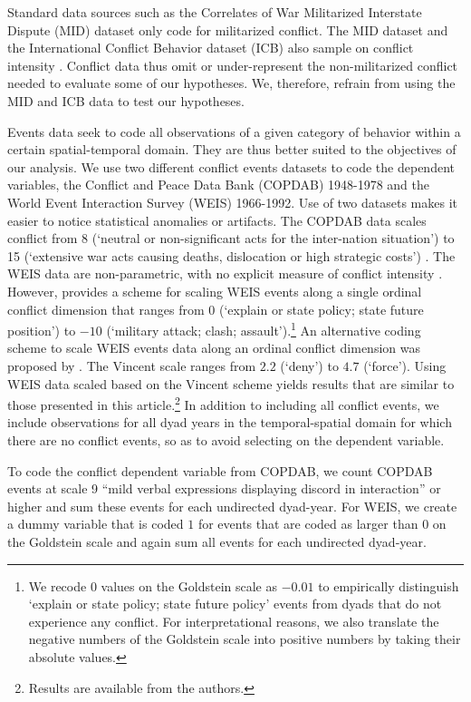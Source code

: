 \documentclass[12pt]{article}
\theoremstyle{hypothesis}
\begin{document}
Standard data sources such as the Correlates of War Militarized Interstate Dispute (MID) dataset only code for militarized conflict. The MID dataset and the International Conflict Behavior dataset (ICB) also sample on conflict intensity \citep{Smith:1998,Brecher:1997}. Conflict data thus omit or under-represent the non-militarized conflict needed to evaluate some of our hypotheses. We, therefore, refrain from using the MID and ICB data to test our hypotheses.

Events data seek to code all observations of a given category of behavior within a certain spatial-temporal domain.  They are thus better suited to the objectives of our analysis. We use two different conflict events datasets to code the dependent variables, the Conflict and Peace Data Bank (COPDAB) 1948-1978 and the World Event Interaction Survey (WEIS) 1966-1992. Use of two datasets makes it easier to notice statistical anomalies or artifacts. The COPDAB data scales conflict from 8 (`neutral or non-significant acts for the inter-nation situation') to 15 (`extensive war acts causing deaths, dislocation or high strategic costs') \citep{Azar:1993}. The WEIS data are non-parametric, with no explicit measure of conflict intensity \citep{McClelland:1983}. However, \citet{Goldstein:1992} provides a scheme for scaling WEIS events along a single ordinal conflict dimension that ranges from $0$ (`explain or state policy; state future position') to $-10$ (`military attack; clash; assault').\footnote{We recode $0$ values on the Goldstein scale as $-0.01$ to empirically distinguish `explain or state policy; state future policy' events from dyads that do not experience any conflict. For interpretational reasons, we also translate the negative numbers of the Goldstein scale into positive numbers by taking their absolute values.} An alternative coding scheme to scale WEIS events data along an ordinal conflict dimension was proposed by \citet{Vincent:1979}. The Vincent scale ranges from $2.2$ (`deny') to $4.7$ (`force'). Using WEIS data scaled based on the Vincent scheme yields results that are similar to those presented in this article.\footnote{Results are available from the authors.} In addition to including all conflict events, we include observations for all dyad years in the temporal-spatial domain for which there are no conflict events, so as to avoid selecting on the dependent variable.

To code the conflict dependent variable from COPDAB, we count COPDAB events at scale 9 ``mild verbal expressions displaying discord in interaction'' or higher and sum these events for each undirected dyad-year. For WEIS, we create a dummy variable that is coded $1$ for events that are coded as larger than $0$ on the Goldstein scale and again sum all events for each undirected dyad-year.
\end{document}
